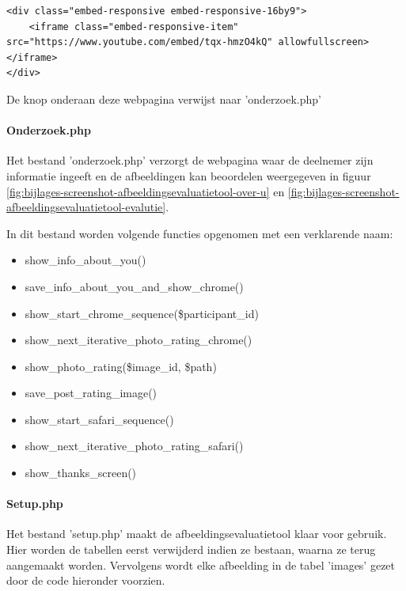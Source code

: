 \begin{lstlisting}[style=htmlcssjs]
<div class="embed-responsive embed-responsive-16by9">
	<iframe class="embed-responsive-item" src="https://www.youtube.com/embed/tqx-hmzO4kQ" allowfullscreen></iframe>
</div>
\end{lstlisting}

De knop onderaan deze webpagina verwijst naar 'onderzoek.php'

\paragraph{Onderzoek.php}
\label{sec:onderzoek-evaluatietool-setup-onderzoek}

Het bestand 'onderzoek.php' verzorgt de webpagina waar de deelnemer zijn informatie ingeeft en de afbeeldingen kan beoordelen weergegeven in figuur \ref{fig:bijlages-screenshot-afbeeldingsevaluatietool-over-u} en \ref{fig:bijlages-screenshot-afbeeldingsevaluatietool-evalutie}.  

In dit bestand worden volgende functies opgenomen met een verklarende naam:

\begin{itemize}
	\item show\_info\_about\_you()
	\item save\_info\_about\_you\_and\_show\_chrome()
	\item show\_start\_chrome\_sequence(\$participant\_id)
	\item show\_next\_iterative\_photo\_rating\_chrome()
	\item show\_photo\_rating(\$image\_id, \$path)
	\item save\_post\_rating\_image()
	\item show\_start\_safari\_sequence()
	\item show\_next\_iterative\_photo\_rating\_safari()
	\item show\_thanks\_screen()
\end{itemize}

\paragraph{Setup.php}
\label{sec:onderzoek-evaluatietool-setup-setup}

Het bestand 'setup.php' maakt de \gls{afbeeldingsevaluatietool} klaar voor gebruik. Hier worden de tabellen eerst verwijderd indien ze bestaan, waarna ze terug aangemaakt worden. Vervolgens wordt elke afbeelding in de tabel 'images' gezet door de code hieronder voorzien.

